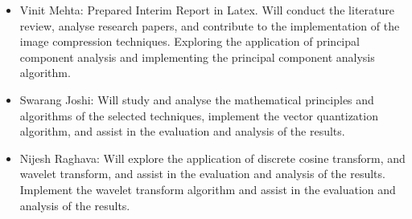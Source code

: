 \documentclass{article}
\begin{document}
\begin{itemize}
    \item Vinit Mehta: Prepared Interim Report in Latex. Will conduct the literature review, analyse research papers, and contribute to the implementation of the image compression techniques. Exploring the application of principal component analysis and implementing the principal component analysis algorithm.
    \item Swarang Joshi: Will study and analyse the mathematical principles and algorithms of the selected techniques, implement the vector quantization algorithm, and assist in the evaluation and analysis of the results.
    \item Nijesh Raghava: Will explore the application of discrete cosine transform, and wavelet transform, and assist in the evaluation and analysis of the results. Implement the wavelet transform algorithm and assist in the evaluation and analysis of the results.
\end{itemize}
\end{document}
